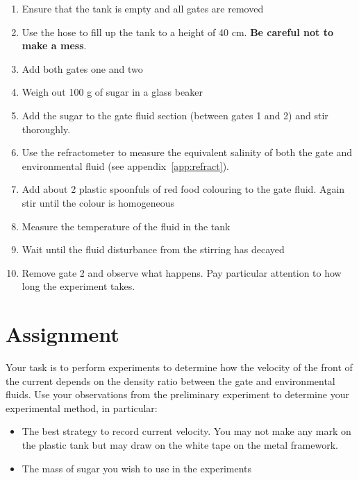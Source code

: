 \documentclass[]{article}
\theoremstyle{definition}
\begin{document}
\begin{enumerate}
\item Ensure that the tank is empty and all gates are removed \\
\item Use the hose to fill up the tank to a height of 40 cm. \textbf{Be careful not to make a mess}. \\
\item Add both gates one and two \\
\item Weigh out 100 g of sugar in a glass beaker \\
\item Add the sugar to the gate fluid section (between gates 1 and 2) and stir thoroughly. \\
\item Use the refractometer to measure the equivalent salinity of both the gate and environmental fluid (see appendix~\ref{app:refract}). \\
\item Add about 2 plastic spoonfuls of red food colouring to the gate fluid. Again stir until the colour is homogeneous \\
\item Measure the temperature of the fluid in the tank
\item Wait until the fluid disturbance from the stirring has decayed \\
\item Remove gate 2 and observe what happens. Pay particular attention to how long the experiment takes. \\
\end{enumerate}

\section{Assignment}
\label{sec:assign}

Your task is to perform experiments to determine how the velocity of the front of the current depends on the density ratio between the gate and environmental fluids. Use your observations from the preliminary experiment to determine your experimental method, in particular:

\begin{itemize}
\item The best strategy to record current velocity. You may not make any mark on the plastic tank but may draw on the white tape on the metal framework. \\
\item The mass of sugar you wish to use in the experiments \\
\end{itemize}
\end{document}
